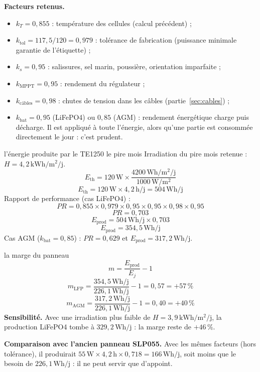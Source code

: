 \documentclass[11pt,a4paper]{article}
\newcommand{\U}[1]{\,\mathrm{#1}}
\begin{document}
\textbf{Facteurs retenus.}
\begin{itemize}[nosep]
\item $k_T = 0{,}855$ : température des cellules (calcul précédent) ;
\item $k_{\text{tol}} = 117{,}5 / 120 = 0{,}979$ : tolérance de fabrication (puissance minimale garantie de l'étiquette) ;
\item $k_s = 0{,}95$ : salissures, sel marin, poussière, orientation imparfaite ;
\item $k_{\text{MPPT}} = 0{,}95$ : rendement du régulateur ;
\item $k_{\text{câbles}} = 0{,}98$ : chutes de tension dans les câbles (partie~\ref{sec:cables}) ;
\item $k_{\text{bat}} = 0{,}95$ (LiFePO4) ou $0{,}85$ (AGM) : rendement énergétique charge puis décharge. Il est appliqué à toute l'énergie, alors qu'une partie est consommée directement le jour : c'est prudent.
\end{itemize}

\begin{calcul}{l'énergie produite par le TE1250 le pire mois}
Irradiation du pire mois retenue : $H = 4{,}2\U{kWh/m^2/j}$.
\[
E_{\text{th}} = 120\U{W} \times \frac{4200\U{Wh/m^2/j}}{1000\U{W/m^2}}
\]
\[
E_{\text{th}} = 120\U{W} \times 4{,}2\U{h/j} = 504\U{Wh/j}
\]
Rapport de performance (cas LiFePO4) :
\[
PR = 0{,}855 \times 0{,}979 \times 0{,}95 \times 0{,}95 \times 0{,}98 \times 0{,}95
\]
\[
PR = 0{,}703
\]
\[
E_{\text{prod}} = 504\U{Wh/j} \times 0{,}703
\]
\[
E_{\text{prod}} = 354{,}5\U{Wh/j}
\]
Cas AGM ($k_{\text{bat}} = 0{,}85$) : $PR = 0{,}629$ et $E_{\text{prod}} = 317{,}2\U{Wh/j}$.
\end{calcul}

\begin{calcul}{la marge du panneau}
\[
m = \frac{E_{\text{prod}}}{E_j} - 1
\]
\[
m_{\text{LFP}} = \frac{354{,}5\U{Wh/j}}{226{,}1\U{Wh/j}} - 1 = 0{,}57 = +57\U{\%}
\]
\[
m_{\text{AGM}} = \frac{317{,}2\U{Wh/j}}{226{,}1\U{Wh/j}} - 1 = 0{,}40 = +40\U{\%}
\]
\textbf{Sensibilité.} Avec une irradiation plus faible de $H = 3{,}9\U{kWh/m^2/j}$, la production LiFePO4 tombe à $329{,}2\U{Wh/j}$ : la marge reste de $+46\U{\%}$.
\end{calcul}

\textbf{Comparaison avec l'ancien panneau SLP055.} Avec les mêmes facteurs (hors tolérance), il produirait $55\U{W} \times 4{,}2\U{h} \times 0{,}718 = 166\U{Wh/j}$, soit moins que le besoin de $226{,}1\U{Wh/j}$ : il ne peut servir que d'appoint.
\end{document}
